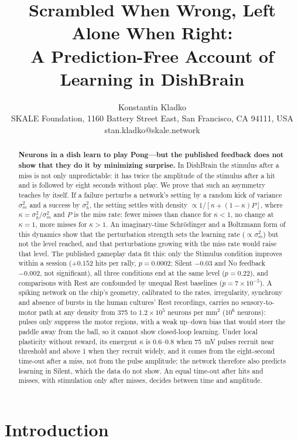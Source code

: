\documentclass[12pt]{article}
\title{Scrambled When Wrong, Left Alone When Right:\\A Prediction-Free Account of Learning in DishBrain}
\author{Konstantin Kladko\\[2pt]
\small SKALE Foundation, 1160 Battery Street East, San Francisco, CA 94111, USA\\ \small stan.kladko@skale.network}
\date{}
\numberwithin{equation}{section}
\begin{document}
\maketitle
\ifreview\doublespacing\linenumbers\fi

\begin{abstract}
\noindent
\textbf{Neurons in a dish learn to play Pong---but the published feedback does not show that they do it by minimizing surprise.} In DishBrain the stimulus after a miss is not only unpredictable: it has twice the amplitude of the stimulus after a hit and is followed by eight seconds without play. We prove that such an asymmetry teaches by itself. If a failure perturbs a network's setting by a random kick of variance $\sigma_m^2$ and a success by $\sigma_h^2$, the setting settles with density $\propto1/[\kappa+(1-\kappa)P]$, where $\kappa=\sigma_h^2/\sigma_m^2$ and $P$ is the miss rate: fewer misses than chance for $\kappa<1$, no change at $\kappa=1$, more misses for $\kappa>1$. An imaginary-time Schr\"odinger and a Boltzmann form of this dynamics show that the perturbation strength sets the learning rate ($\propto\sigma_m^2$) but not the level reached, and that perturbations growing with the miss rate would raise that level. The published gameplay data fit this: only the Stimulus condition improves within a session ($+0.152$ hits per rally, $p=0.0002$; Silent $-0.03$ and No feedback $-0.002$, not significant), all three conditions end at the same level ($p=0.22$), and comparisons with Rest are confounded by unequal Rest baselines ($p=7\times10^{-5}$). A spiking network on the chip's geometry, calibrated to the rates, irregularity, synchrony and absence of bursts in the human cultures' Rest recordings, carries no sensory-to-motor path at any density from 375 to $1.2\times10^5$ neurons per mm$^2$ ($10^6$ neurons): pulses only suppress the motor regions, with a weak up--down bias that would steer the paddle away from the ball, so it cannot show closed-loop learning. Under local plasticity without reward, its emergent $\kappa$ is 0.6--0.8 when 75~mV pulses recruit near threshold and above 1 when they recruit widely, and it comes from the eight-second time-out after a miss, not from the pulse amplitude; the network therefore also predicts learning in Silent, which the data do not show. An equal time-out after hits and misses, with stimulation only after misses, decides between time and amplitude.
\end{abstract}

\section{Introduction}
\end{document}
